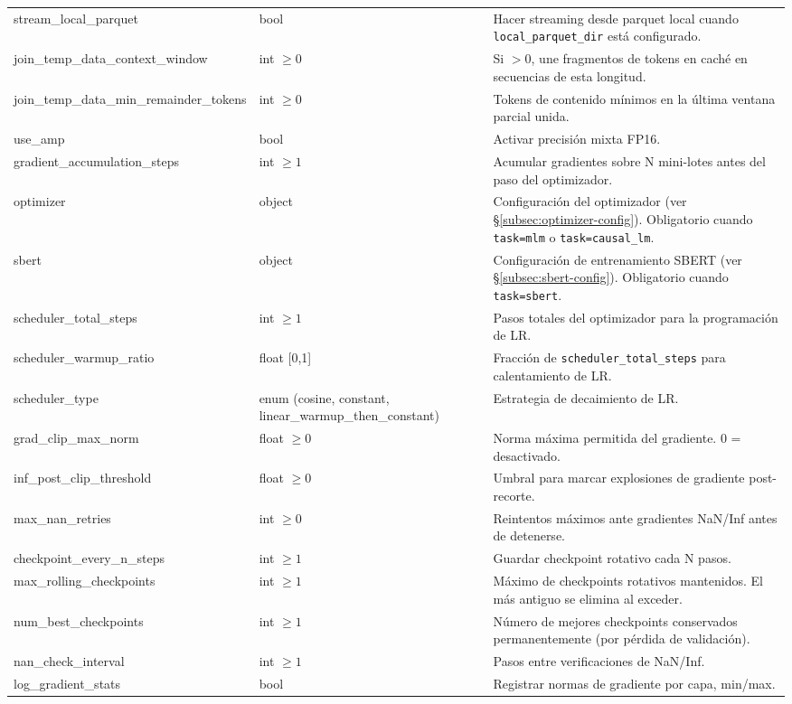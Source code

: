 \begin{longtable}{>{\ttfamily\footnotesize\raggedright\arraybackslash}p{5.6cm}>{\raggedright\arraybackslash}p{2.4cm}>{\raggedright\arraybackslash}p{6.9cm}}
stream\_local\_parquet & bool & Hacer streaming desde parquet local cuando \texttt{local\_parquet\_dir} está configurado. \\
join\_temp\_data\_context\_window & int $\ge 0$ & Si $>0$, une fragmentos de tokens en caché en secuencias de esta longitud. \\
join\_temp\_data\_min\_remainder\_tokens & int $\ge 0$ & Tokens de contenido mínimos en la última ventana parcial unida. \\
use\_amp & bool & Activar precisión mixta FP16. \\
gradient\_accumulation\_steps & int $\ge 1$ & Acumular gradientes sobre N mini-lotes antes del paso del optimizador. \\
optimizer & object & Configuración del optimizador (ver \S\ref{subsec:optimizer-config}). Obligatorio cuando \texttt{task=mlm} o \texttt{task=causal\_lm}. \\
sbert & object & Configuración de entrenamiento SBERT (ver \S\ref{subsec:sbert-config}). Obligatorio cuando \texttt{task=sbert}. \\
scheduler\_total\_steps & int $\ge 1$ & Pasos totales del optimizador para la programación de LR. \\
scheduler\_warmup\_ratio & float [0,1] & Fracción de \texttt{scheduler\_total\_steps} para calentamiento de LR. \\
scheduler\_type & enum (cosine, constant, linear\_warmup\_then\_constant) & Estrategia de decaimiento de LR. \\
grad\_clip\_max\_norm & float $\ge 0$ & Norma máxima permitida del gradiente. 0 = desactivado. \\
inf\_post\_clip\_threshold & float $\ge 0$ & Umbral para marcar explosiones de gradiente post-recorte. \\
max\_nan\_retries & int $\ge 0$ & Reintentos máximos ante gradientes NaN/Inf antes de detenerse. \\
checkpoint\_every\_n\_steps & int $\ge 1$ & Guardar checkpoint rotativo cada N pasos. \\
max\_rolling\_checkpoints & int $\ge 1$ & Máximo de checkpoints rotativos mantenidos. El más antiguo se elimina al exceder. \\
num\_best\_checkpoints & int $\ge 1$ & Número de mejores checkpoints conservados permanentemente (por pérdida de validación). \\
nan\_check\_interval & int $\ge 1$ & Pasos entre verificaciones de NaN/Inf. \\
log\_gradient\_stats & bool & Registrar normas de gradiente por capa, min/max. \\

\end{longtable}
